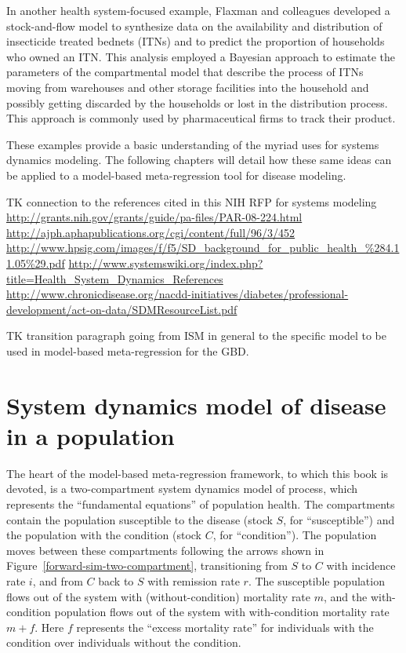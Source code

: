 In another health system-focused example, Flaxman and colleagues developed a stock-and-flow model to synthesize data on the availability and distribution of insecticide treated bednets (ITNs) and to predict the proportion of households who owned an ITN. This analysis employed a Bayesian approach to estimate the parameters of the compartmental model that describe the process of ITNs moving from warehouses and other storage facilities into the household and possibly getting discarded by the households or lost in the distribution process.  This approach is commonly used by pharmaceutical firms to track their product.

These examples provide a basic understanding of the myriad uses for systems dynamics modeling. The following chapters will detail how these same ideas can be applied to a model-based meta-regression tool for disease modeling. 




TK connection to the references cited in this NIH RFP for systems modeling
\url{http://grants.nih.gov/grants/guide/pa-files/PAR-08-224.html}
\url{http://ajph.aphapublications.org/cgi/content/full/96/3/452}
\url{http://www.hpsig.com/images/f/f5/SD_background_for_public_health_%284.11.05%29.pdf}
\url{http://www.systemswiki.org/index.php?title=Health_System_Dynamics_References}
\url{http://www.chronicdisease.org/nacdd-initiatives/diabetes/professional-development/act-on-data/SDMResourceList.pdf}



TK transition paragraph going from ISM in general to the specific model to be used in model-based meta-regression for the GBD.

\section{System dynamics model of disease in a population}

The heart of the model-based meta-regression framework, to which this book is devoted, is a two-compartment system dynamics model of process, which represents the ``fundamental equations'' of population health. The compartments contain the population susceptible to the disease (stock $S$, for ``susceptible'') and the population with the condition (stock $C$, for ``condition''). The population moves between these compartments following the arrows shown in Figure~\ref{forward-sim-two-compartment}, transitioning from $S$ to $C$ with incidence rate $i$, and from $C$ back to $S$ with remission rate $r$. The susceptible population flows out of the system with (without-condition) mortality rate $m$, and the with-condition population flows out of the system with with-condition mortality rate $m+f$.  Here $f$ represents the ``excess mortality rate'' for individuals with the condition over individuals without the condition.

